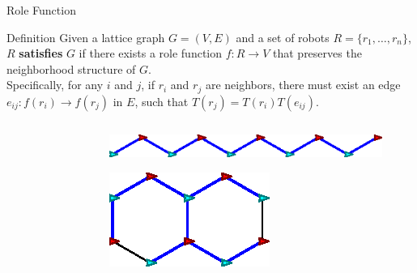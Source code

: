 \documentclass[10pt]{beamer}
\newcommand{\edge}[3]{{#1}\overset{#2}{\longrightarrow}{#3}}
\begin{document}
\begin{frame}{Role Function}
  \begin{block}{}
  \begin{bclogo}[logo=\bccrayon, couleur=orange!10, arrondi=0.1, ombre=true]{Definition}
    \small{Given a lattice graph $G=(V, E)$ and a set of robots $R = \{
    r_1, \ldots, r_n \}$, $R$ \textbf{satisfies} $G$ if
    there exists a role function $f: R \rightarrow V$ that preserves
    the neighborhood structure of $G$.
    \\
    Specifically, for any $i$ and $j$, if $r_i$ and $r_j$ are neighbors, 
    there must exist an edge
    $e_{ij}: \edge{f(r_i)}{}{f(r_j)}$ in $E$, such that
    $ T(r_j) = T(r_i) T(e_{ij})$.}
  \end{bclogo}
  \begin{columns}[T] 
    \begin{column}{.4\textwidth}
      \begin{figure}
        \centering
      \end{figure}
    \end{column}%
    \begin{column}{.5\textwidth}
      \begin{figure}
        \centering
        \includegraphics[width=\linewidth]{figs/bad-hexagon}
      \end{figure}
      \begin{figure}
        \centering
        \includegraphics[scale=1]{figs/good-hexagon}
        \end{figure}
    \end{column}%
  \end{columns}
  \end{block}
\end{frame}
\end{document}

